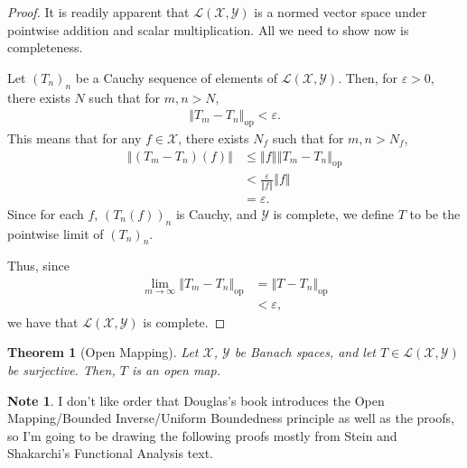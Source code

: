 \documentclass[12pt]{extarticle}
\newcommand{\norm}[1]{\left\Vert #1\right\Vert}
\newcommand{\ve}{\varepsilon}
\theoremstyle{plain}
\newtheorem*{theorem}{Theorem}
\theoremstyle{definition}
\theoremstyle{note}
\newtheorem*{note}{Note}
\renewcommand{\newline}{\hfill\break}
\begin{document}
\begin{proof}
  It is readily apparent that $\mathcal{L}\left(\mathcal{X},\mathcal{Y}\right)$ is a normed vector space under pointwise addition and scalar multiplication. All we need to show now is completeness. \newline

  Let $\left(T_n\right)_n$ be a Cauchy sequence of elements of $\mathcal{L}\left(\mathcal{X},\mathcal{Y}\right)$. Then, for $\ve > 0$, there exists $N$ such that for $m,n > N$,
  \begin{align*}
    \norm{T_m - T_n}_{\text{op}} < \ve.
  \end{align*}
  This means that for any $f\in \mathcal{X}$, there exists $N_f$ such that for $m,n > N_f$,
  \begin{align*}
    \norm{\left(T_m - T_n\right)(f)} &\leq \norm{f}\norm{T_m-T_n}_{\text{op}}\\
                                     &< \frac{\ve}{\norm{f}} \norm{f}\\
                                     &= \ve.
  \end{align*}
  Since for each $f$, $\left(T_n(f)\right)_n$ is Cauchy, and $\mathcal{Y}$ is complete, we define $T$ to be the pointwise limit of $\left(T_n\right)_n$.\newline

  Thus, since
  \begin{align*}
    \lim_{m\rightarrow\infty}\norm{T_m - T_n}_{\text{op}} &= \norm{T - T_n}_{\text{op}}\\
                                                          &< \ve,
  \end{align*}
  we have that $\mathcal{L}\left(\mathcal{X},\mathcal{Y}\right)$ is complete.
\end{proof}
\begin{theorem}[Open Mapping]
  Let $\mathcal{X}$, $\mathcal{Y}$ be Banach spaces, and let $T\in \mathcal{L}\left(\mathcal{X},\mathcal{Y}\right)$ be surjective. Then, $T$ is an open map.
\end{theorem}
\begin{note}
  I don't like order that Douglas's book introduces the Open Mapping/Bounded Inverse/Uniform Boundedness principle as well as the proofs, so I'm going to be drawing the following proofs mostly from Stein and Shakarchi's Functional Analysis text.
\end{note}
\end{document}
